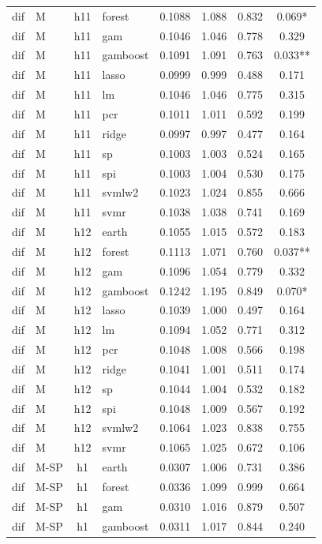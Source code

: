 \begin{ThreePartTable}
\begin{longtable}[t]{llclcccc}
dif & M & h11 & forest & 0.1088 & 1.088 & 0.832 & 0.069*\\
dif & M & h11 & gam & 0.1046 & 1.046 & 0.778 & 0.329\\
dif & M & h11 & gamboost & 0.1091 & 1.091 & 0.763 & 0.033**\\
dif & M & h11 & lasso & 0.0999 & 0.999 & 0.488 & 0.171\\
dif & M & h11 & lm & 0.1046 & 1.046 & 0.775 & 0.315\\
dif & M & h11 & pcr & 0.1011 & 1.011 & 0.592 & 0.199\\
dif & M & h11 & ridge & 0.0997 & 0.997 & 0.477 & 0.164\\
dif & M & h11 & sp & 0.1003 & 1.003 & 0.524 & 0.165\\
dif & M & h11 & spi & 0.1003 & 1.004 & 0.530 & 0.175\\
dif & M & h11 & svmlw2 & 0.1023 & 1.024 & 0.855 & 0.666\\
dif & M & h11 & svmr & 0.1038 & 1.038 & 0.741 & 0.169\\
\addlinespace
dif & M & h12 & earth & 0.1055 & 1.015 & 0.572 & 0.183\\
dif & M & h12 & forest & 0.1113 & 1.071 & 0.760 & 0.037**\\
dif & M & h12 & gam & 0.1096 & 1.054 & 0.779 & 0.332\\
dif & M & h12 & gamboost & 0.1242 & 1.195 & 0.849 & 0.070*\\
dif & M & h12 & lasso & 0.1039 & 1.000 & 0.497 & 0.164\\
dif & M & h12 & lm & 0.1094 & 1.052 & 0.771 & 0.312\\
dif & M & h12 & pcr & 0.1048 & 1.008 & 0.566 & 0.198\\
dif & M & h12 & ridge & 0.1041 & 1.001 & 0.511 & 0.174\\
dif & M & h12 & sp & 0.1044 & 1.004 & 0.532 & 0.182\\
dif & M & h12 & spi & 0.1048 & 1.009 & 0.567 & 0.192\\
dif & M & h12 & svmlw2 & 0.1064 & 1.023 & 0.838 & 0.755\\
dif & M & h12 & svmr & 0.1065 & 1.025 & 0.672 & 0.106\\
\addlinespace
dif & M-SP & h1 & earth & 0.0307 & 1.006 & 0.731 & 0.386\\
dif & M-SP & h1 & forest & 0.0336 & 1.099 & 0.999 & 0.664\\
dif & M-SP & h1 & gam & 0.0310 & 1.016 & 0.879 & 0.507\\
dif & M-SP & h1 & gamboost & 0.0311 & 1.017 & 0.844 & 0.240\\

\end{longtable}
\end{ThreePartTable}
